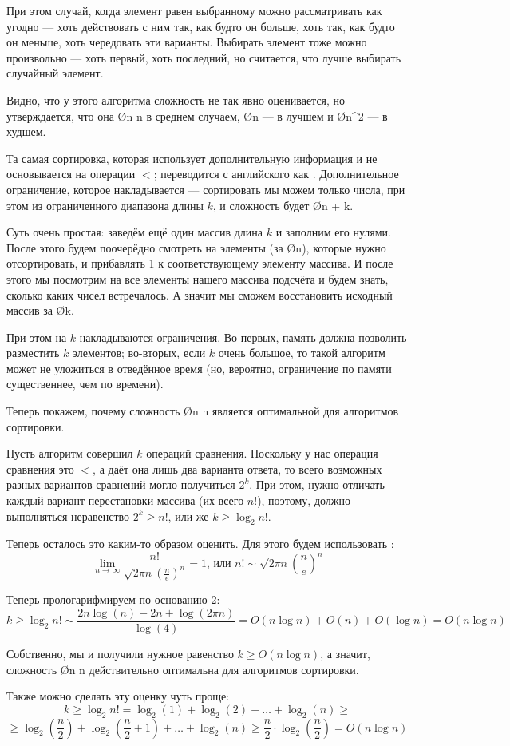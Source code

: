 При этом случай, когда элемент равен выбранному можно рассматривать как угодно — хоть действовать с ним так, как будто он больше, хоть так, как будто он меньше, хоть чередовать эти варианты. Выбирать элемент тоже можно произвольно — хоть первый, хоть последний, но считается, что лучше выбирать случайный элемент.

Видно, что у этого алгоритма сложность не так явно оценивается, но утверждается, что она \O{n \log n} в среднем случаем, \O{n} — в лучшем и \O{n^2} — в худшем.

Та самая сортировка, которая использует дополнительную информация и не основывается на операции $<$; переводится с английского как . Дополнительное ограничение, которое накладывается — сортировать мы можем только числа, при этом из ограниченного диапазона длины $k$, и сложность будет \O{n + k}.

Суть очень простая: заведём ещё один массив длина $k$ и заполним его нулями. После этого будем поочерёдно смотреть на элементы (за \O{n}), которые нужно отсортировать, и прибавлять 1 к соответствующему элементу массива. И после этого мы посмотрим на все элементы нашего массива подсчёта и будем знать, сколько каких чисел встречалось. А значит мы сможем восстановить исходный массив за \O{k}.

При этом на $k$ накладываются ограничения. Во-первых, память должна позволить разместить $k$ элементов; во-вторых, если $k$ очень большое, то такой алгоритм может не уложиться в отведённое время (но, вероятно, ограничение по памяти существеннее, чем по времени).

Теперь покажем, почему сложность \O{n \log n} является оптимальной для алгоритмов сортировки. 

Пусть алгоритм совершил $k$ операций сравнения. Поскольку у нас операция сравнения это $<$, а даёт она лишь два варианта ответа, то всего возможных разных вариантов сравнений могло получиться $2^k$. При этом, нужно отличать каждый вариант перестановки массива (их всего $n!$), поэтому, должно выполняться неравенство $2^k \geq n!$, или же $k \geq \log_2 n!$.

Теперь осталось это каким-то образом оценить. Для этого будем использовать :
$$\lim\limits_{n\to \infty} \frac{n!}{\sqrt{2\pi n} \left({ \frac{n}{e} }\right)^{n} }=1 \text{, или } n! \sim {\sqrt{2\pi n}} \left({ \frac{n}{e} }\right) ^{n}$$

Теперь прологарифмируем по основанию 2:
$$k \geq \log_2 n! \sim \frac{2n\log(n) - 2n + \log(2 \pi n)}{\log(4)} = O(n \log n) + O(n) + O(\log n) = O(n \log n)$$

Собственно, мы и получили нужное равенство $k \geq O(n \log n)$, а значит, сложность \O{n \log n} действительно оптимальна для алгоритмов сортировки.

Также можно сделать эту оценку чуть проще:
$$k \geq \log_2 n! = \log_2(1) + \log_2(2) + \ldots + \log_2(n) \geq $$
$$ \geq \log_2\left(\frac{n}{2}\right) + \log_2\left(\frac{n}{2} + 1\right) + \ldots + \log_2(n) \geq \frac{n}{2} \cdot \log_2 \left( \frac{n}{2} \right) = O(n \log n)$$
